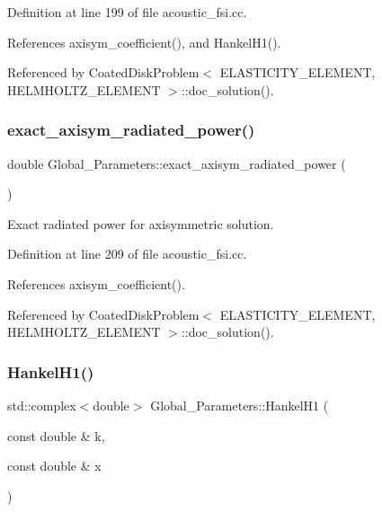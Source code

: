 Definition at line 199 of file acoustic\+\_\+fsi.\+cc.



References axisym\+\_\+coefficient(), and Hankel\+H1().



Referenced by Coated\+Disk\+Problem$<$ E\+L\+A\+S\+T\+I\+C\+I\+T\+Y\+\_\+\+E\+L\+E\+M\+E\+N\+T, H\+E\+L\+M\+H\+O\+L\+T\+Z\+\_\+\+E\+L\+E\+M\+E\+N\+T $>$\+::doc\+\_\+solution().

\mbox{\label{namespaceGlobal__Parameters_a79131fd1bf3eb1ab080c21c2d98a92d5}} 
\subsubsection{\texorpdfstring{exact\+\_\+axisym\+\_\+radiated\+\_\+power()}{exact\_axisym\_radiated\_power()}}
{\footnotesize\ttfamily double Global\+\_\+\+Parameters\+::exact\+\_\+axisym\+\_\+radiated\+\_\+power (\begin{DoxyParamCaption}{ }\end{DoxyParamCaption})}



Exact radiated power for axisymmetric solution. 



Definition at line 209 of file acoustic\+\_\+fsi.\+cc.



References axisym\+\_\+coefficient().



Referenced by Coated\+Disk\+Problem$<$ E\+L\+A\+S\+T\+I\+C\+I\+T\+Y\+\_\+\+E\+L\+E\+M\+E\+N\+T, H\+E\+L\+M\+H\+O\+L\+T\+Z\+\_\+\+E\+L\+E\+M\+E\+N\+T $>$\+::doc\+\_\+solution().

\mbox{\label{namespaceGlobal__Parameters_a116765fbd117ec6199c9399af801d510}} 
\subsubsection{\texorpdfstring{Hankel\+H1()}{HankelH1()}}
{\footnotesize\ttfamily std\+::complex$<$double$>$ Global\+\_\+\+Parameters\+::\+Hankel\+H1 (\begin{DoxyParamCaption}\item[{const double \&}]{k,  }\item[{const double \&}]{x }\end{DoxyParamCaption})}



